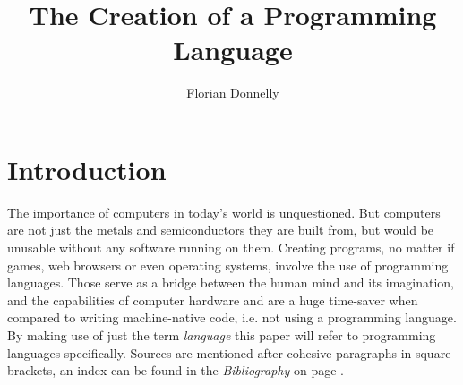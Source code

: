 \documentclass[12pt,a4paper]{article}
\author{Florian Donnelly}
\title{The Creation of a Programming Language}
\newcommand{\ver}[1]{
    \expandafter\ifstrequal\expandafter{\jobname}{paper}
    {#1}{}
}
\newcommand{\paste}[1]{
    \begin{tabular}{c}
    
    \end{tabular}
}
\newcommand{\name}{\emph{TestScript}}
\begin{document}

\normalsize


\tableofcontents\newpage

\section{Introduction}
The importance of computers in today's world is unquestioned.
But computers are not just the metals and semiconductors they are built from,
but would be unusable without any software running on them.
Creating programs, no matter if games, web browsers or even operating systems,
involve the use of programming languages.
Those serve as a bridge between the human mind and its imagination, and
the capabilities of computer hardware and are a huge time-saver when compared
to writing machine-native code, i.e. not using a programming language.
By making use of just the term \emph{language} this paper will refer to programming
languages specifically. Sources are mentioned after cohesive paragraphs in
square brackets, an index can be found in the \emph{Bibliography} on page
\pageref{bibliography}.
\end{document}

